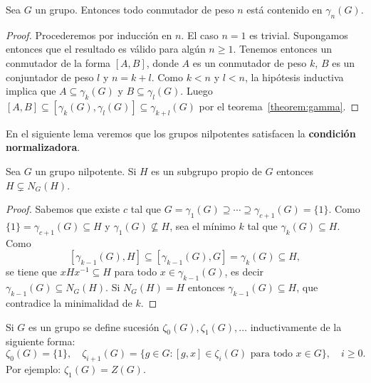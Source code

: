 \begin{corollary}
	Sea $G$ un grupo.  Entonces todo conmutador de peso $n$ está contenido en
	$\gamma_n(G)$.
\end{corollary}

\begin{proof}
	Procederemos por inducción en $n$. El caso $n=1$ es trivial. Supongamos
	entonces que el resultado es válido para algún $n\geq1$.  Tenemos entonces
	un conmutador de la forma $[A,B]$, donde $A$ es un conmutador de peso $k$,
	$B$ es un conjuntador de peso $l$ y $n=k+l$. Como $k<n$ y $l<n$, la
	hipótesis inductiva implica que $A\subseteq \gamma_k(G)$ y $B\subseteq
	\gamma_l(G)$. Luego $[A,B]\subseteq [\gamma_k(G),\gamma_l(G)]\subseteq
	\gamma_{k+l}(G)$ por el
	teorema~\ref{theorem:gamma}.
\end{proof}


En el siguiente lema veremos que los grupos nilpotentes satisfacen la
\textbf{condición normalizadora}.

\begin{lemma}
	\label{lemma:normalizadora}
	Sea $G$ un grupo nilpotente. Si $H$ es un subgrupo propio de $G$ entonces
	$H\subsetneq N_G(H)$.
\end{lemma}

\begin{proof}
	Sabemos que existe $c$ tal que $G=\gamma_1(G)\supseteq\cdots\supseteq\gamma_{c+1}(G)=\{1\}$. Como 
	$\{1\}=\gamma_{c+1}(G)\subseteq H$ y $\gamma_1(G)\not\subseteq H$, 
	sea el mínimo $k$ tal que $\gamma_k(G)\subseteq H$. Como
	\[
		[\gamma_{k-1}(G),H]\subseteq [\gamma_{k-1}(G),G]=\gamma_k(G)\subseteq H,
	\]
	se tiene que 
	$xHx^{-1}\subseteq H$ para todo $x\in\gamma_{k-1}(G)$,
	es decir $\gamma_{k-1}(G)\subseteq N_G(H)$. Si $N_G(H)=H$ entonces
	$\gamma_{k-1}(G)\subseteq H$, que contradice la minimalidad de $k$. 
\end{proof}



Si $G$ es un grupo se define sucesión $\zeta_0(G),\zeta_1(G),\dots$
inductivamente de la siguiente forma:
\[
	\zeta_0(G)=\{1\},\quad
	\zeta_{i+1}(G)=\{g\in G:[g,x]\in\zeta_{i}(G)\text{ para todo $x\in G$}\},\quad i\geq 0.
\]
Por ejemplo: $\zeta_1(G)=Z(G)$.

